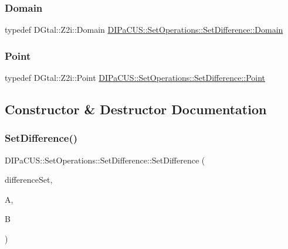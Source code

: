 \subsubsection{\texorpdfstring{Domain}{Domain}}
{\footnotesize\ttfamily typedef D\+Gtal\+::\+Z2i\+::\+Domain \mbox{\hyperlink{structDIPaCUS_1_1SetOperations_1_1SetDifference_aed21483576b1d6d75f3ca062d7ee15ad}{D\+I\+Pa\+C\+U\+S\+::\+Set\+Operations\+::\+Set\+Difference\+::\+Domain}}}

\mbox{\label{structDIPaCUS_1_1SetOperations_1_1SetDifference_acb0cc5c28b3744944fe56e7e765924e8}} 
\subsubsection{\texorpdfstring{Point}{Point}}
{\footnotesize\ttfamily typedef D\+Gtal\+::\+Z2i\+::\+Point \mbox{\hyperlink{structDIPaCUS_1_1SetOperations_1_1SetDifference_acb0cc5c28b3744944fe56e7e765924e8}{D\+I\+Pa\+C\+U\+S\+::\+Set\+Operations\+::\+Set\+Difference\+::\+Point}}}



\subsection{Constructor \& Destructor Documentation}
\mbox{\label{structDIPaCUS_1_1SetOperations_1_1SetDifference_ae616c273fb711dcd2a982e06034b1967}} 
\subsubsection{\texorpdfstring{Set\+Difference()}{SetDifference()}}
{\footnotesize\ttfamily D\+I\+Pa\+C\+U\+S\+::\+Set\+Operations\+::\+Set\+Difference\+::\+Set\+Difference (\begin{DoxyParamCaption}\item[{\mbox{\hyperlink{structDIPaCUS_1_1SetOperations_1_1SetDifference_aeaafa3335e3f7cb0918a015a64b711ac}{Digital\+Set}} \&}]{difference\+Set,  }\item[{const \mbox{\hyperlink{structDIPaCUS_1_1SetOperations_1_1SetDifference_aeaafa3335e3f7cb0918a015a64b711ac}{Digital\+Set}} \&}]{A,  }\item[{const \mbox{\hyperlink{structDIPaCUS_1_1SetOperations_1_1SetDifference_aeaafa3335e3f7cb0918a015a64b711ac}{Digital\+Set}} \&}]{B }\end{DoxyParamCaption})\hspace{0.3cm}{\ttfamily [inline]}}



